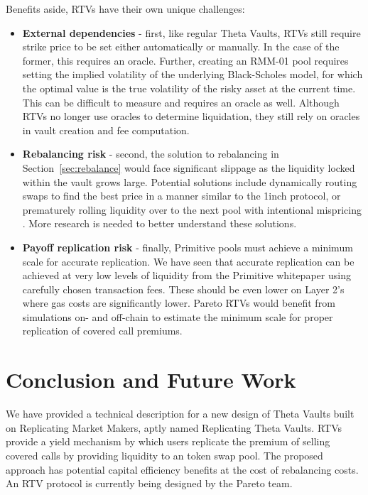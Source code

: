\documentclass[hidelinks, 12pt]{article}
\begin{document}
Benefits aside, RTVs have their own unique challenges:
\begin{itemize}
    \item \textbf{External dependencies} - first, like regular Theta Vaults, RTVs still require strike price to be set either automatically or manually. In the case of the former, this requires an oracle. Further, creating an RMM-01 pool requires setting the implied volatility of the underlying Black-Scholes model, for which the optimal value is the true volatility of the risky asset at the current time. This can be difficult to measure and requires an oracle as well. Although RTVs no longer use oracles to determine liquidation, they still rely on oracles in vault creation and fee computation.
    \item \textbf{Rebalancing risk} - second, the solution to rebalancing in Section~\ref{sec:rebalance} would face significant slippage as the liquidity locked within the vault grows large. Potential solutions include dynamically routing swaps to find the best price in a manner similar to the 1inch protocol, or prematurely rolling liquidity over to the next pool with intentional mispricing \cite{sterrett2022replicating}. More research is needed to better understand these solutions.
    \item \textbf{Payoff replication risk} - finally, Primitive pools must achieve a minimum scale for accurate replication. We have seen that accurate replication can be achieved at very low levels of liquidity from the Primitive whitepaper using carefully chosen transaction fees. These should be even lower on Layer 2's where gas costs are significantly lower. Pareto RTVs would benefit from simulations on- and off-chain to estimate the minimum scale for proper replication of covered call premiums.
\end{itemize}

\section{Conclusion and Future Work}

We have provided a technical description for a new design of Theta Vaults built on Replicating Market Makers, aptly named Replicating Theta Vaults. RTVs provide a yield mechanism by which users replicate the premium of selling covered calls by providing liquidity to an token swap pool. The proposed approach has potential capital efficiency benefits at the cost of rebalancing costs.
An RTV protocol is currently being designed by the Pareto team.
\end{document}
